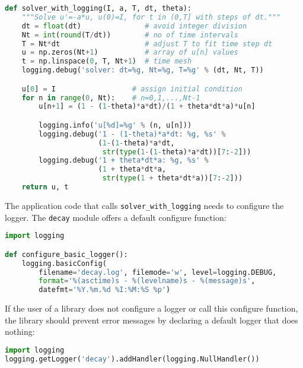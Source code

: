 \documentclass[graybox,sectrefs,envcountresetchap,open=right,final]{svmonodo}
\begin{document}
\begin{lstlisting}[language=python,style=blue1_bluegreen]
def solver_with_logging(I, a, T, dt, theta):
    """Solve u'=-a*u, u(0)=I, for t in (0,T] with steps of dt."""
    dt = float(dt)               # avoid integer division
    Nt = int(round(T/dt))        # no of time intervals
    T = Nt*dt                    # adjust T to fit time step dt
    u = np.zeros(Nt+1)           # array of u[n] values
    t = np.linspace(0, T, Nt+1)  # time mesh
    logging.debug('solver: dt=%g, Nt=%g, T=%g' % (dt, Nt, T))

    u[0] = I                  # assign initial condition
    for n in range(0, Nt):    # n=0,1,...,Nt-1
        u[n+1] = (1 - (1-theta)*a*dt)/(1 + theta*dt*a)*u[n]

        logging.info('u[%d]=%g' % (n, u[n]))
        logging.debug('1 - (1-theta)*a*dt: %g, %s' %
                      (1-(1-theta)*a*dt,
                       str(type(1-(1-theta)*a*dt))[7:-2]))
        logging.debug('1 + theta*dt*a: %g, %s' %
                      (1 + theta*dt*a,
                       str(type(1 + theta*dt*a))[7:-2]))
    return u, t

\end{lstlisting}

The application code that calls \Verb!solver_with_logging! needs to configure
the logger. The \texttt{decay} module offers a default configure function:









\begin{lstlisting}[language=python,style=blue1_bluegreen]
import logging

def configure_basic_logger():
    logging.basicConfig(
        filename='decay.log', filemode='w', level=logging.DEBUG,
        format='%(asctime)s - %(levelname)s - %(message)s',
        datefmt='%Y.%m.%d %I:%M:%S %p')

\end{lstlisting}

If the user of a library does not configure a logger or call this
configure function, the library should prevent error messages by
declaring a default logger that does nothing:




\begin{lstlisting}[language=python,style=blue1_bluegreen]
import logging
logging.getLogger('decay').addHandler(logging.NullHandler())

\end{lstlisting}
\end{document}
